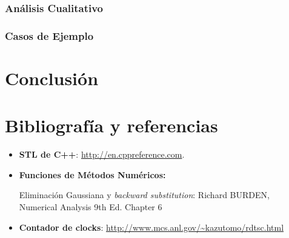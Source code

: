 \subsubsection{Análisis Cualitativo}

\subsubsection{Casos de Ejemplo}
	
	
\section{Conclusión}


\section{Bibliografía y referencias} %

\begin{itemize}
	\item \textbf{STL de C++}: \url{http://en.cppreference.com}.
	\item \textbf{Funciones de Métodos Numéricos:}
		\par Eliminación Gaussiana y \textit{backward substitution}: Richard BURDEN, Numerical Analysis 9th Ed. Chapter 6
	\item \textbf{Contador de clocks}: \url{http://www.mcs.anl.gov/\~kazutomo/rdtsc.html}
\end{itemize}



